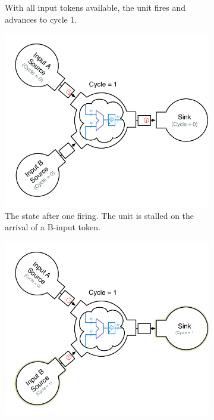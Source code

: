 \begin{figure}
\begin{subfigure}[t]{0.45\textwidth}
        \caption{With all input tokens available, the unit fires and advances to cycle 1.}
    \end{subfigure}
    \begin{subfigure}[t]{0.45\textwidth}
        \captionsetup{margin=0.25cm}
        \includegraphics[width=\columnwidth]{figures/adder-example3.pdf}
        \caption{The state after one firing. The unit is stalled on the arrival of a B-input token.}
    \end{subfigure}
    \begin{subfigure}[t]{0.45\textwidth}
        \captionsetup{margin=0.25cm}
        \includegraphics[width=\columnwidth]{figures/adder-example4.pdf}

\end{subfigure}
\end{figure}
